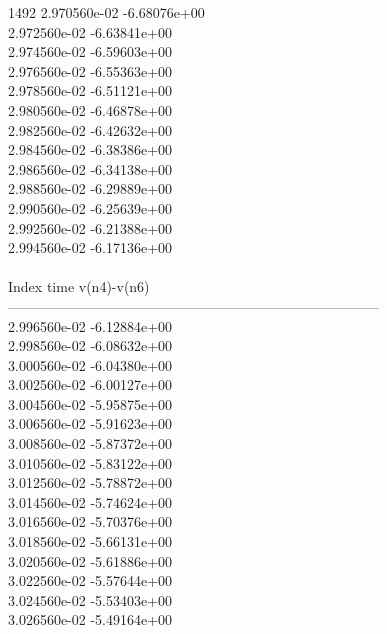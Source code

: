 1492	2.970560e-02	-6.68076e+00	\\ 	2.972560e-02	-6.63841e+00	\\ 	2.974560e-02	-6.59603e+00	\\ 	2.976560e-02	-6.55363e+00	\\ 	2.978560e-02	-6.51121e+00	\\ 	2.980560e-02	-6.46878e+00	\\ 	2.982560e-02	-6.42632e+00	\\ 	2.984560e-02	-6.38386e+00	\\ 	2.986560e-02	-6.34138e+00	\\ 	2.988560e-02	-6.29889e+00	\\ 	2.990560e-02	-6.25639e+00	\\ 	2.992560e-02	-6.21388e+00	\\ 	2.994560e-02	-6.17136e+00	\\ \hline
\\ \hline
Index   time            v(n4)-v(n6)     \\ \hline
--------------------------------------------------------------------------------\\ 	2.996560e-02	-6.12884e+00	\\ 	2.998560e-02	-6.08632e+00	\\ 	3.000560e-02	-6.04380e+00	\\ 	3.002560e-02	-6.00127e+00	\\ 	3.004560e-02	-5.95875e+00	\\ 	3.006560e-02	-5.91623e+00	\\ 	3.008560e-02	-5.87372e+00	\\ 	3.010560e-02	-5.83122e+00	\\ 	3.012560e-02	-5.78872e+00	\\ 	3.014560e-02	-5.74624e+00	\\ 	3.016560e-02	-5.70376e+00	\\ 	3.018560e-02	-5.66131e+00	\\ 	3.020560e-02	-5.61886e+00	\\ 	3.022560e-02	-5.57644e+00	\\ 	3.024560e-02	-5.53403e+00	\\ 	3.026560e-02	-5.49164e+00	\\ \hline
